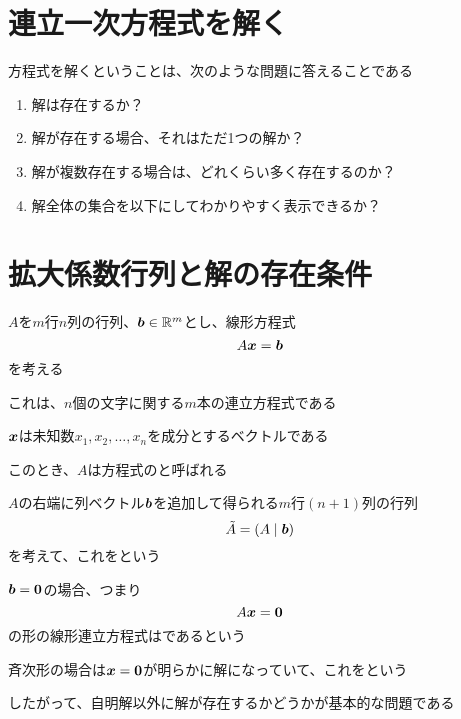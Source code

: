 \documentclass[../../../topic_linear-equation]{subfiles}
\begin{document}
\sectionline
\section{連立一次方程式を解く}

方程式を解くということは、次のような問題に答えることである

\begin{enumerate}[label=\Alph*.]
  \item 解は存在するか？
  \item 解が存在する場合、それはただ1つの解か？
  \item 解が複数存在する場合は、どれくらい多く存在するのか？
  \item 解全体の集合を以下にしてわかりやすく表示できるか？
\end{enumerate}

\sectionline
\section{拡大係数行列と解の存在条件}

$A$を$m$行$n$列の行列、$\vb*{b} \in \mathbb{R}^m$とし、線形方程式
\begin{equation*}
  A\vb*{x} = \vb*{b}
\end{equation*}
を考える

これは、$n$個の文字に関する$m$本の連立方程式である

$\vb*{x}$は未知数$x_1, x_2, \dots, x_n$を成分とするベクトルである

\br

このとき、$A$は方程式のと呼ばれる

$A$の右端に列ベクトル$\vb*{b}$を追加して得られる$m$行$(n+1)$列の行列
\begin{equation*}
  \tilde{A} = (A \mid \vb*{b})
\end{equation*}
を考えて、これをという

\sectionline

$\vb*{b}=\vb*{0}$の場合、つまり
\begin{equation*}
  A\vb*{x} = \vb*{0}
\end{equation*}
の形の線形連立方程式はであるという

\br

斉次形の場合は$\vb*{x} = \vb*{0}$が明らかに解になっていて、これをという

したがって、自明解以外に解が存在するかどうかが基本的な問題である
\end{document}
